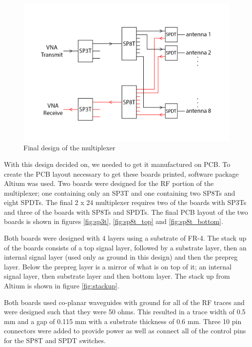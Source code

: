 \begin{figure}[h]
	\begin{center}
		\includegraphics[width=5in]{./images/mp_final_layout.png}
		\caption{Final design of the multiplexer}
		\label{fig:mp_final_layout}
	\end{center}
\end{figure}


With this design decided on, we needed to get it manufactured on PCB. To create the PCB layout necessary to get these boards printed, software package Altium was used. Two boards were designed for the RF portion of the multiplexer; one containing only an SP3T and one containing two SP8Ts and eight SPDTs. The final 2 x 24 multiplexer requires two of the boards with SP3Ts and three of the boards with SP8Ts and SPDTs. The final PCB layout of the two boards is shown in figures \ref{fig:sp3t}, \ref{fig:sp8t_top} and \ref{fig:sp8t_bottom}.

Both boards were designed with 4 layers using a substrate of FR-4. The stack up of the boards consists of a top signal layer, followed by a substrate layer, then an internal signal layer (used only as ground in this design) and then the prepreg layer. Below the prepreg layer is a mirror of what is on top of it; an internal signal layer, then substrate layer and then bottom layer. The stack up from Altium is shown in figure \ref{fig:stackup}. 

Both boards used co-planar waveguides with ground for all of the RF traces and were designed such that they were 50 ohms. This resulted in a trace width of 0.5 mm and a gap of 0.115 mm with a substrate thickness of 0.6 mm. Three 10 pin connectors were added to provide power as well as connect all of the control pins for the SP8T and SPDT switches.

